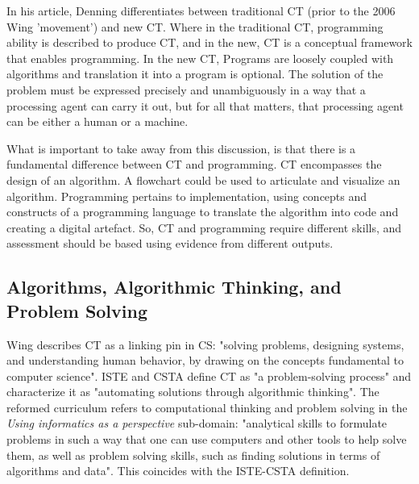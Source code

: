 In his article, Denning \cite{denning2017remaining} differentiates between traditional CT (prior to the 2006 Wing 'movement') and new CT. Where in the traditional CT, programming ability is described to produce CT, and in the new, CT is a conceptual framework that enables programming. In the new CT, Programs are loosely coupled with algorithms and translation it into a program is optional. The solution of the problem must be expressed precisely and unambiguously in a way that a processing agent can carry it out, but for all that matters, that processing agent can be either a human or a machine\cite{corradini2017conceptions}.

What is important to take away from this discussion, is that there is a fundamental difference between CT and programming. CT encompasses the design of an algorithm. A flowchart could be used to articulate and visualize an algorithm. Programming pertains to implementation, using concepts and constructs of a programming language to translate the algorithm into code and creating a digital artefact. So, CT and programming require different skills, and assessment should be based using evidence from different outputs.



\subsection{Algorithms, Algorithmic Thinking, and Problem Solving}


Wing \cite{Wing2006}describes CT as a linking pin in CS: "solving problems, designing systems, and understanding human behavior, by drawing on the concepts fundamental to computer science". ISTE and CSTA define CT as "a problem-solving process"\cite{CSTA2011CT} and characterize it as "automating solutions through algorithmic thinking". The reformed curriculum refers to computational thinking and problem solving in the \emph{Using informatics as a perspective} sub-domain: "analytical skills to formulate problems in such a way that one can use computers and other tools to help solve them, as well as problem solving skills,
such as finding solutions in terms of algorithms and data"\cite{Barendsen2016}. This coincides with the ISTE-CSTA definition.



